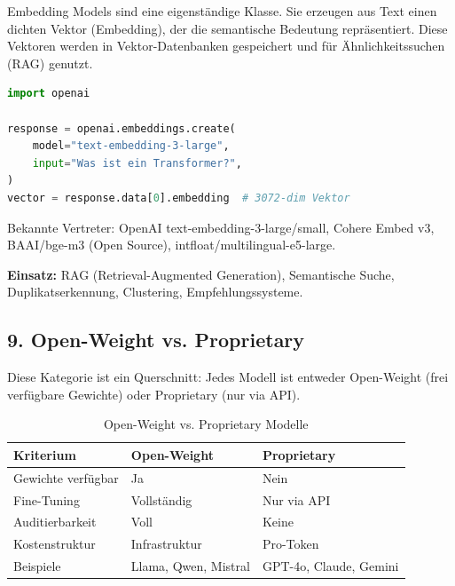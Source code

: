 Embedding Models sind eine eigenständige Klasse. Sie erzeugen aus Text einen dichten Vektor (Embedding), der die semantische Bedeutung repräsentiert. Diese Vektoren werden in Vektor-Datenbanken gespeichert und für Ähnlichkeitssuchen (RAG) genutzt.

\begin{lstlisting}[language=Python, caption={Embedding-Modell -- Vektorisierung}, label=lst:embedding]
import openai

response = openai.embeddings.create(
    model="text-embedding-3-large",
    input="Was ist ein Transformer?",
)
vector = response.data[0].embedding  # 3072-dim Vektor
\end{lstlisting}

Bekannte Vertreter: OpenAI text-embedding-3-large/small, Cohere Embed v3, BAAI/bge-m3 (Open Source), intfloat/multilingual-e5-large.

\textbf{Einsatz:} RAG (Retrieval-Augmented Generation), Semantische Suche, Duplikatserkennung, Clustering, Empfehlungssysteme.

\subsection{9. Open-Weight vs. Proprietary}

Diese Kategorie ist ein Querschnitt: Jedes Modell ist entweder Open-Weight (frei verfügbare Gewichte) oder Proprietary (nur via API).

\begin{table}[H]
\centering
\begin{tabularx}{\linewidth}{lXX}
\toprule
\textbf{Kriterium} & \textbf{Open-Weight} & \textbf{Proprietary} \\
\midrule
Gewichte verfügbar & Ja & Nein \\
Fine-Tuning & Vollständig & Nur via API \\
Auditierbarkeit & Voll & Keine \\
Kostenstruktur & Infrastruktur & Pro-Token \\
Beispiele & Llama, Qwen, Mistral & GPT-4o, Claude, Gemini \\
\bottomrule
\end{tabularx}
\caption{Open-Weight vs. Proprietary Modelle}
\label{tab:open-weight-proprietary}
\end{table}


